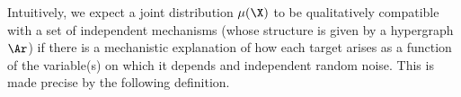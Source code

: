 Intuitively, we expect a joint distribution $\mu(\X)$ to be 
qualitatively
compatible with a {s}et of {i}ndependent {m}echanisms
%
(whose structure is given by a hypergraph $\Ar$)
if 
there is
a mechanistic explanation of how each target
arises as a function of the variable(s) on which it depends
and independent random noise.
This is made precise by the following definition.

